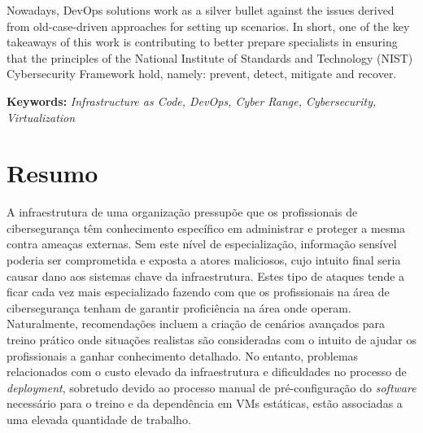 Nowadays, DevOps solutions work as a silver bullet against the issues derived from old-case-driven approaches for setting up scenarios. In short, one of the key takeaways of this work is contributing to better prepare specialists in ensuring that the principles of the National Institute of Standards and Technology (NIST) Cybersecurity Framework hold, namely: prevent, detect, mitigate and recover.\\

\newcommand{\titles}[2]{\noindent\textbf{#1:} #2\\[2mm]}

\titles{Keywords}{\textit{Infrastructure as Code, DevOps, Cyber Range, Cybersecurity, Virtualization}}

\clearpage\phantom{}

\chapter*{Resumo}

A infraestrutura de uma organização pressupõe que os profissionais de cibersegurança têm conhecimento específico em administrar e proteger a mesma contra ameaças externas. Sem este nível de especialização, informação sensível poderia ser comprometida e exposta a atores maliciosos, cujo intuito final seria causar dano aos sistemas chave da infraestrutura. Estes tipo de ataques tende a ficar cada vez mais especializado fazendo com que os profissionais na área de cibersegurança tenham de garantir proficiência na área onde operam. Naturalmente, recomendações incluem a criação de cenários avançados para treino prático onde situações realistas são consideradas com o intuito de ajudar os profissionais a ganhar conhecimento detalhado. No entanto, problemas relacionados com o custo elevado da infraestrutura e dificuldades no processo de \textit{deployment}, sobretudo devido ao processo manual de pré-configuração do \textit{software} necessário para o treino e da dependência em VMs estáticas, estão associadas a uma elevada quantidade de trabalho.

